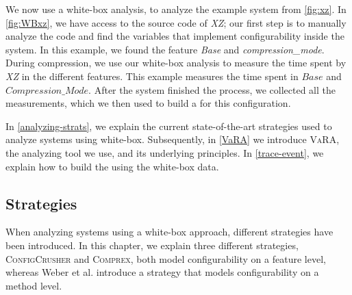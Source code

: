 We now use a white-box analysis, to analyze the example system from \autoref{fig:xz}. 
In \autoref{fig:WBxz}, we have access to the source code of \textit{XZ}; 
our first step is to manually analyze the code and find the variables that implement configurability inside the system. 
In this example, we found the feature \textit{Base} and \textit{compression\_mode}. 
During compression, we use our white-box analysis to measure the time spent by \textit{XZ} in the different features. 
This example measures the time spent in $Base$ and $Compression\_Mode$. 
After the system finished the process, we collected all the measurements, which we then used to build a {\perfInfluenceModel} for this configuration.

In \autoref{analyzing-strats}, we explain the current state-of-the-art strategies used to analyze systems using white-box. 
Subsequently, in \autoref{VaRA} we introduce \textsc{VaRA}, the analyzing tool we use, and its underlying principles. 
In \autoref{trace-event}, we explain how to build the {\perfInfluenceModel} using the white-box data.

\subsection{Strategies}\label{analyzing-strats}
When analyzing systems using a white-box approach, different strategies have been introduced. 
In this chapter, we explain three different strategies, \textsc{ConfigCrusher} and \textsc{Comprex}, 
both model configurability on a feature level, whereas Weber et al. introduce a strategy that models configurability on a method level.

